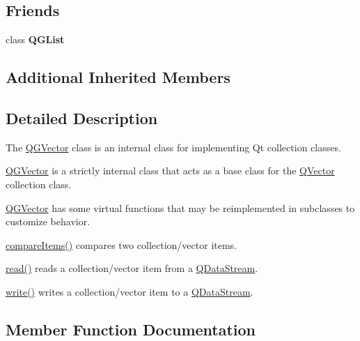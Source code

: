 \subsection*{Friends}
\begin{DoxyCompactItemize}
\item 
\mbox{\label{class_q_g_vector_a9bfde3c3259271cb86b87bd78b399dd5}} 
class {\bfseries Q\+G\+List}
\end{DoxyCompactItemize}
\subsection*{Additional Inherited Members}


\subsection{Detailed Description}
The \mbox{\hyperlink{class_q_g_vector}{Q\+G\+Vector}} class is an internal class for implementing Qt collection classes. 

\mbox{\hyperlink{class_q_g_vector}{Q\+G\+Vector}} is a strictly internal class that acts as a base class for the \mbox{\hyperlink{class_q_vector}{Q\+Vector}} collection class.

\mbox{\hyperlink{class_q_g_vector}{Q\+G\+Vector}} has some virtual functions that may be reimplemented in subclasses to customize behavior.


\begin{DoxyItemize}
\item \mbox{\hyperlink{class_q_g_vector_a65a79a6de037a4033ead55891622f5e2}{compare\+Items()}} compares two collection/vector items. 
\item \mbox{\hyperlink{structcmd_8h_a9c7b76d5266903891c803132d51ccb90}{read()}} reads a collection/vector item from a \mbox{\hyperlink{class_q_data_stream}{Q\+Data\+Stream}}. 
\item \mbox{\hyperlink{structcmd_8h_af2a3ea719b83f672637febdd87c36c36}{write()}} writes a collection/vector item to a \mbox{\hyperlink{class_q_data_stream}{Q\+Data\+Stream}}. 
\end{DoxyItemize}

\subsection{Member Function Documentation}
\mbox{\label{class_q_g_vector_aefe0a7fe991a79788cc3317eb3e5daa1}} 
